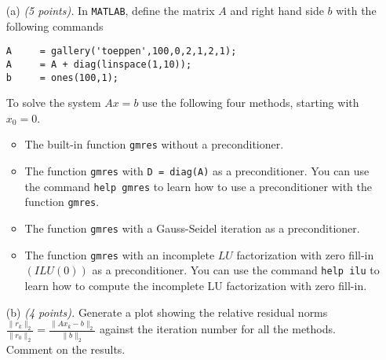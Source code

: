 \documentclass[10pt]{report}
\begin{document}
\begin{enumerate}
\begin{itemize}
\item[(a)] \textit{(5 points).} In \verb+MATLAB+, define the matrix $A$ and right hand side $b$ with the following commands
\begin{verbatim}
A     = gallery('toeppen',100,0,2,1,2,1);
A     = A + diag(linspace(1,10));
b     = ones(100,1);
\end{verbatim}

To solve the system $Ax=b$ use the following four methods, starting with $x_0=0$.
 
\begin{itemize}
\item The built-in function \verb+gmres+ without a preconditioner.

\item The function \verb+gmres+ with \verb+D = diag(A)+ as a  preconditioner. You can use the command \verb+help gmres+ to learn how to use a preconditioner with the function \verb+gmres+.

\item The function \verb+gmres+ with a Gauss-Seidel iteration as a preconditioner.

\item The function \verb+gmres+ with an incomplete $LU$ factorization with zero
  fill-in $(ILU(0))$ as a preconditioner. You can use the command \verb+help ilu+ to learn how to compute the incomplete LU factorization with zero fill-in.
\end{itemize} 

\item[(b)] \textit{(4 points).} Generate a plot showing the relative residual norms $\frac{\|r_k\|_2}{\|r_0\|_2}=\frac{\|Ax_k-b\|_{2}}{\|b\|_2}$ against the iteration number for all the methods. Comment on the results. 

\end{itemize}

\end{enumerate}
\end{document}

